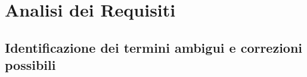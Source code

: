 \section{Analisi dei Requisiti}
%
%

\subsection*{Identificazione dei termini ambigui e correzioni possibili}
%
%

